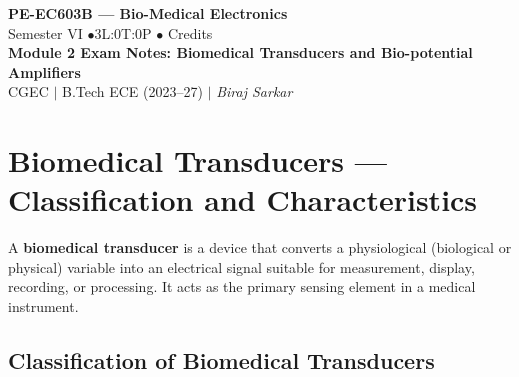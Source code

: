 \documentclass[12pt,a4paper]{article}
\begin{document}

\begin{center}
  {\LARGE\bfseries\color{myred} PE-EC603B --- Bio-Medical Electronics}\\[5pt]
  {\normalsize\color{mydark} Semester VI \quad$\bullet$\quad 3L:0T:0P \quad$\bullet$ Credits}\\[3pt]
  {\normalsize\color{myteal}\textbf{Module 2 Exam Notes: Biomedical Transducers and Bio-potential Amplifiers}}\\[3pt]
  {\small\color{mydark} CGEC \;$|$\; B.Tech ECE (2023--27) \;$|$\; \textit{Biraj Sarkar}}
\end{center}
\vspace{2pt}
\noindent{\color{myred}\rule{\linewidth}{1.5pt}}
\vspace{2pt}

\hypersetup{linkcolor=mydark}
\tableofcontents
\hypersetup{linkcolor=myteal}
\newpage

\section{Biomedical Transducers --- Classification and Characteristics}

\begin{tcolorbox}[defbox, title={\textbf{Definition: Biomedical Transducer}}]
A \textbf{biomedical transducer} is a device that converts a physiological (biological or physical) variable into an electrical signal suitable for measurement, display, recording, or processing. It acts as the primary sensing element in a medical instrument.
\end{tcolorbox}

\subsection{Classification of Biomedical Transducers}
\end{document}

